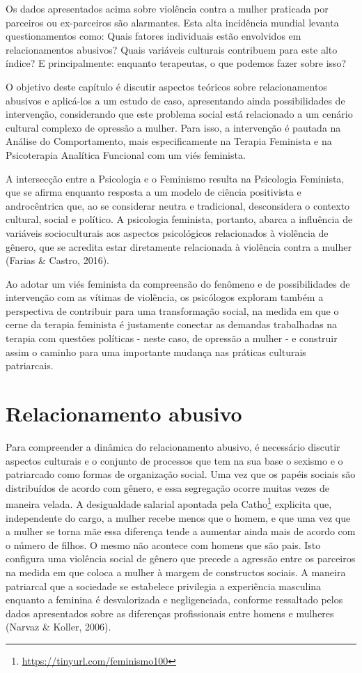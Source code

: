 Os dados apresentados acima sobre violência contra a mulher praticada por parceiros ou ex-parceiros são alarmantes. Esta alta incidência mundial levanta questionamentos como: Quais fatores individuais estão envolvidos em relacionamentos abusivos? Quais variáveis culturais contribuem para este alto índice? E principalmente: enquanto terapeutas, o que podemos fazer sobre isso?

O objetivo deste capítulo é discutir aspectos teóricos sobre relacionamentos abusivos e aplicá-los a um estudo de caso, apresentando ainda possibilidades de intervenção, considerando que este problema social está relacionado a um cenário cultural complexo de opressão a mulher. Para isso, a intervenção é pautada na Análise do Comportamento, mais especificamente na Terapia Feminista e na Psicoterapia Analítica Funcional com um viés feminista.

A intersecção entre a Psicologia e o Feminismo resulta na Psicologia Feminista, que se afirma enquanto resposta a um modelo de ciência positivista e androcêntrica que, ao se considerar neutra e tradicional, desconsidera o contexto cultural, social e político. A psicologia feminista, portanto, abarca a influência de variáveis socioculturais aos aspectos psicológicos relacionados à violência de gênero, que se acredita estar diretamente relacionada à violência contra a mulher (Farias \& Castro, 2016). 

Ao adotar um viés feminista da compreensão do fenômeno e de possibilidades de intervenção com as vítimas de violência, os psicólogos exploram também a perspectiva de contribuir para uma transformação social, na medida em que o cerne da terapia feminista é justamente conectar as demandas trabalhadas na terapia com questões políticas - neste caso, de opressão a mulher - e construir assim o caminho para uma importante mudança nas práticas culturais patriarcais.

\section{Relacionamento abusivo}

Para compreender a dinâmica do relacionamento abusivo, é necessário discutir aspectos culturais e o conjunto de processos que tem na sua base o sexismo e o patriarcado como formas de organização social. Uma vez que os papéis sociais são distribuídos de acordo com gênero, e essa segregação ocorre muitas vezes de maneira velada. A desigualdade salarial apontada pela Catho\footnote{\url{https://tinyurl.com/feminismo100}} explicita que, independente do cargo, a mulher recebe menos que o homem, e que uma vez que a mulher se torna mãe essa diferença tende a aumentar ainda mais de acordo com o número de filhos. O mesmo não acontece com homens que são pais. Isto configura uma violência social de gênero que precede a agressão entre os parceiros na medida em que coloca a mulher à margem de constructos sociais. A maneira patriarcal que a sociedade se estabelece privilegia a experiência masculina enquanto a feminina é desvalorizada e negligenciada, conforme ressaltado pelos dados apresentados sobre as diferenças profissionais entre homens e mulheres (Narvaz \& Koller, 2006).


